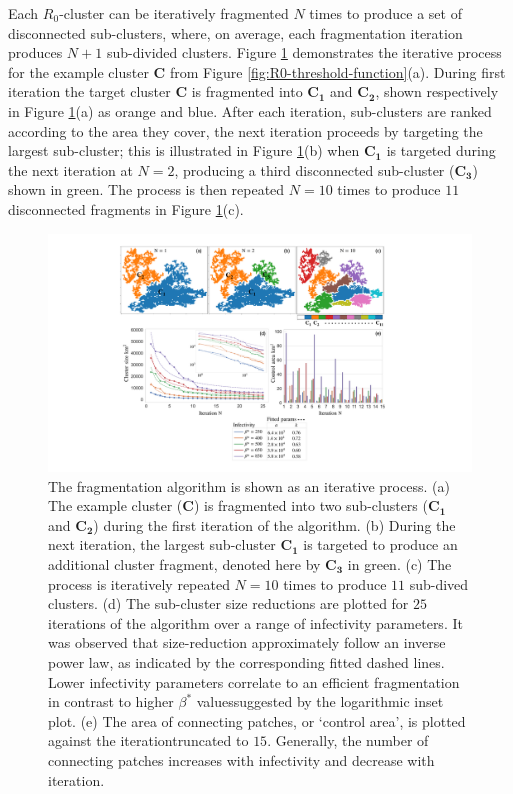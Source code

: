 Each $R_0$-cluster can be iteratively fragmented $N$ times to produce a set of disconnected sub-clusters, 
where, on average, each fragmentation iteration produces $N+1$ sub-divided clusters.
Figure \ref{fig:iterative-fragmentations} demonstrates the iterative process for the example cluster $\mathbf{C}$ from Figure \ref{fig:R0-threshold-function}(a).
During first iteration the target cluster $\mathbf{C}$ is fragmented into $\mathbf{C_1}$ and $\mathbf{C_2}$, shown respectively in Figure \ref{fig:iterative-fragmentations}(a) as orange and blue.
After each iteration, sub-clusters are ranked according to the area they cover, the next iteration proceeds by targeting the largest sub-cluster;
this is illustrated in Figure \ref{fig:iterative-fragmentations}(b) when $\mathbf{C_1}$ is targeted during the next iteration at $N=2$, producing a third disconnected sub-cluster ($\mathbf{C_3}$) shown in green. 
The process is then repeated $N=10$ times to produce $11$ disconnected fragments in Figure \ref{fig:iterative-fragmentations}(c).

\begin{figure}
    \centering
    \includegraphics[scale=0.41]{chapter7/figures/figure2-Iiterative-frag.pdf}
    \caption{
    The fragmentation algorithm is shown as an iterative process. 
    (a) The example cluster ($\mathbf{C}$) is fragmented into two sub-clusters ($\mathbf{C_1}$ and $\mathbf{C_2}$) during the first iteration of the algorithm.
    (b) During the next iteration, the largest sub-cluster $\mathbf{C_1}$ is targeted to produce an additional cluster fragment, denoted here by $\mathbf{C_3}$ in green.
    (c) The process is iteratively repeated $N=10$ times to produce $11$ sub-dived clusters.
    (d) The sub-cluster size reductions are plotted for $25$ iterations of the algorithm over a range of infectivity parameters. It was observed that size-reduction approximately follow an inverse power law, as indicated by the corresponding fitted dashed lines.
    Lower infectivity parameters correlate to an efficient fragmentation in contrast to higher $\beta^*$ values\textemdash suggested by the logarithmic inset plot.
    (e) The area of connecting patches, or `control area', is plotted against the iteration\textemdash truncated to $15$. 
    Generally, the number of connecting patches increases with infectivity and decrease with iteration.
    }
    \label{fig:iterative-fragmentations}
\end{figure}

